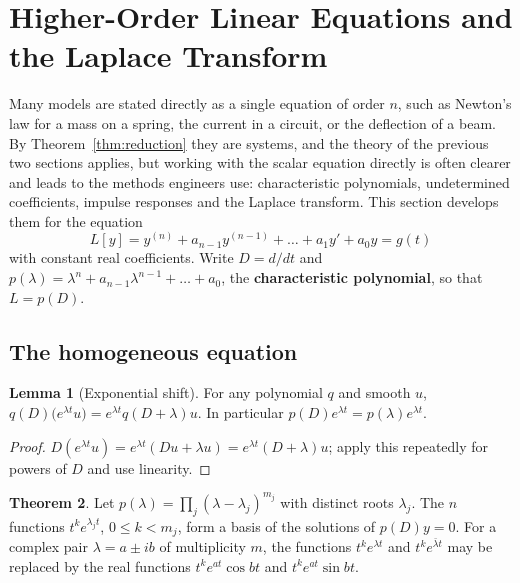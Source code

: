 \documentclass[11pt,a4paper]{article}
\numberwithin{equation}{section}
\theoremstyle{definition}
\newtheorem{thm}{Theorem}[subsection]
\newtheorem{lem}[thm]{Lemma}
\begin{document}
\section{Higher-Order Linear Equations and the Laplace Transform}
\label{sec:higher}

Many models are stated directly as a single equation of order $n$, such as Newton's law for a mass on a spring, the current in a circuit, or the
deflection of a beam. By Theorem~\ref{thm:reduction} they are systems, and the theory of the previous two sections applies, but working with the scalar
equation directly is often clearer and leads to the methods engineers use: characteristic polynomials, undetermined coefficients, impulse responses
and the Laplace transform. This section develops them for the equation
\[
L[y] = y^{(n)} + a_{n-1}y^{(n-1)} + \dots + a_1y' + a_0y = g(t)
\]
with constant real coefficients. Write $D = d/dt$ and $p(\lambda) = \lambda^n + a_{n-1}\lambda^{n-1} + \dots + a_0$, the \textbf{characteristic polynomial}, so that $L = p(D)$.

\subsection{The homogeneous equation}
\label{ssec:charpoly}

\begin{lem}[Exponential shift]
\label{lem:shift}
For any polynomial $q$ and smooth $u$, $q(D)\bigl(e^{\lambda t}u\bigr) = e^{\lambda t}q(D + \lambda)u$. In particular $p(D)e^{\lambda t} = p(\lambda)e^{\lambda t}$.
\end{lem}

\begin{proof}
$D(e^{\lambda t}u) = e^{\lambda t}(Du + \lambda u) = e^{\lambda t}(D + \lambda)u$; apply this repeatedly for powers of $D$ and use linearity.
\end{proof}

\begin{thm}
\label{thm:charbasis}
Let $p(\lambda) = \prod_j(\lambda - \lambda_j)^{m_j}$ with distinct roots $\lambda_j$. The $n$ functions $t^ke^{\lambda_jt}$, $0 \leq k < m_j$, form a basis of the solutions of $p(D)y = 0$. For a complex pair
$\lambda = a \pm ib$ of multiplicity $m$, the functions $t^ke^{\lambda t}$ and $t^ke^{\bar\lambda t}$ may be replaced by the real functions $t^ke^{at}\cos bt$ and $t^ke^{at}\sin bt$.
\end{thm}
\end{document}
